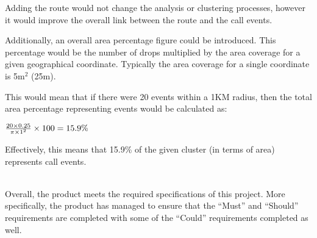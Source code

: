 Adding the route would not change the analysis or clustering processes, however
it would improve the overall link between the route and the call events.

Additionally, an overall area percentage figure could be introduced. This 
percentage would be the number of drops multiplied by the area coverage for a
given geographical coordinate. Typically the area coverage for a single 
coordinate is 5m$^2$ (25m). 

This would mean that if there were 20 events within a 1KM radius, then the 
total area percentage representing events would be calculated as:

\begin{center}
  $ \large \frac{20 \times 0.25}{\pi \times 1^2} \times 100 = 15.9\% $
\end{center}

Effectively, this means that 15.9\% of the given cluster (in terms of area) 
represents call events.

~\\

Overall, the product meets the required specifications of this project. More 
specifically, the product has managed to ensure that the ``Must'' and 
``Should'' requirements are completed with some of the ``Could'' requirements
completed as well.
